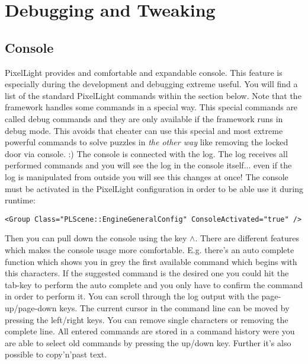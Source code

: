 \section{Debugging and Tweaking}




\subsection{Console}
PixelLight provides and comfortable and expandable console. This feature is especially during the development and debugging extreme useful. You will find a list of the standard PixelLight commands within the section below. Note that the framework handles some commands in a special way. This special commands are called debug commands and they are only available if the framework runs in debug mode. This avoids that cheater can use this special and most extreme powerful commands to solve puzzles in \emph{the other way} like removing the locked door via console. :) The console is connected with the log. The log receives all performed commands and you will see the log in the console itself... even if the log is manipulated from outside you will see this changes at once! The console must be activated in the PixelLight configuration in order to be able use it during runtime:

\begin{lstlisting}[caption=Activate the console within the PixelLight configuration]
<Group Class="PLScene::EngineGeneralConfig" ConsoleActivated="true" />
\end{lstlisting}

Then you can pull down the console using the key \(\land\). There are different features which makes the console usage more comfortable. E.g. there's an auto complete function which shows you in grey the first available command which begins with this characters. If the suggested command is the desired one you could hit the tab-key to perform the auto complete and you only have to confirm the command in order to perform it. You can scroll through the log output with the page-up/page-down keys. The current cursor in the command line can be moved by pressing the left/right keys. You can remove single characters or removing the complete line. All entered commands are stored in a command history were you are able to select old commands by pressing the up/down key. Further it's also possible to copy'n'past text.



